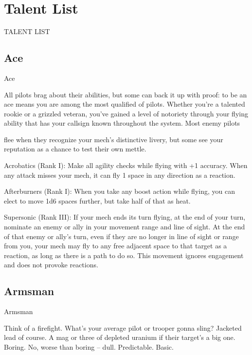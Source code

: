 \section{Talent List}


                                                                                                             


                                        TALENT LIST
 
\subsection{Ace}

                                                       Ace  

All pilots brag about their abilities, but some can back it up with proof: to be an ace means you are among  
the most qualified of pilots. Whether you’re a talented rookie or a grizzled veteran, you’ve gained a level of  
notoriety through your flying ability that has your callsign known throughout the system. Most enemy pilots  

flee when they recognize your mech’s distinctive livery, but some see your reputation as a chance to test  
their own mettle.   

Acrobatics  (Rank I): Make all agility checks while flying with +1 accuracy. When any attack  
misses your mech, it can fly 1 space in any direction as a reaction.
 
Afterburners  (Rank I): When you take any boost action while flying, you can elect to move 1d6  
spaces further, but take half of that as heat.
 
Supersonic (Rank III): If your mech ends its turn flying, at the end of your turn, nominate an  
enemy or ally in your movement range and line of sight. At the end of that enemy or ally’s turn,  
even if they are no longer in line of sight or range from you, your mech may fly to any free  
adjacent space to that target as a reaction, as long as there is a path to do so. This movement  
ignores engagement and does not provoke reactions.

 \subsection{Armsman}


                                                  Armsman  

 Think of a firefight. What’s your average pilot or trooper gonna sling? Jacketed lead of course. A mag or  
three of depleted uranium if their target’s a big one. Boring. No, worse than boring -- dull. Predictable.  
Basic.   

